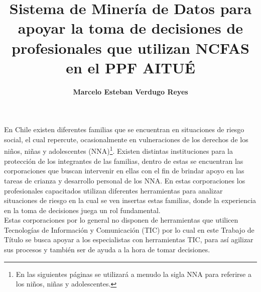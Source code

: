 \documentclass[12pt,letterpaper]{report}
\begin{document}
\title{\textbf{Sistema de Minería de Datos para apoyar la toma de decisiones de profesionales que utilizan NCFAS en el PPF AITUÉ}}
\author{\textbf{Marcelo Esteban Verdugo Reyes}}

\beforepreface
{}
En Chile existen diferentes familias que se encuentran en situaciones de riesgo social, el cual repercute, ocasionalmente en vulneraciones de los derechos de los niños, niñas y adolescentes (NNA)\footnote{En las siguientes páginas se utilizará a menudo la sigla NNA para referirse a los niños, niñas y adolescentes.}. Existen distintas instituciones para la protección de los integrantes de las familias, dentro de estas se encuentran las corporaciones que buscan intervenir en ellas con el fin de brindar apoyo en las tareas de crianza y desarrollo personal de los NNA. 
En estas corporaciones los profesionales capacitados utilizan diferentes herramientas para analizar situaciones de riesgo en la cual se ven insertas estas familias, donde la experiencia en la toma de decisiones juega un rol fundamental.\\ 
Estas corporaciones por lo general no disponen de herramientas que utilicen Tecnologías de Informaci\'on y Comunicaci\'on (TIC) por lo cual en este Trabajo de T\'itulo se busca apoyar a los especialistas con herramientas TIC, para as\'i agilizar sus procesos y tambi\'en ser de ayuda a la hora de tomar decisiones.


\renewcommand{\thepage}{\roman{page}}
\tableofcontents
\newpage
\listoftables
\listoffigures
\newpage

\renewcommand{\thepage}{\arabic{page}}






\end{document}
